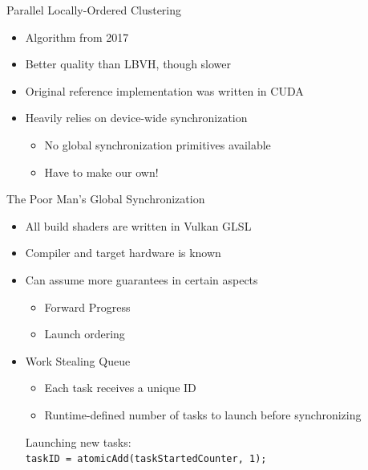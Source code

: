 \documentclass[aspectratio=169,t]{beamer}
\begin{document}
\begin{slide}{Parallel Locally-Ordered Clustering}
  \begin{itemize}
   \item Algorithm from 2017
   \item Better quality than LBVH, though slower
   \item Original reference implementation was written in CUDA
   \item Heavily relies on device-wide synchronization
   \begin{itemize}
    \item No global synchronization primitives available
    \item Have to make our own!
   \end{itemize}
  \end{itemize}
\end{slide}

\begin{slide}{The Poor Man's Global Synchronization}
  \begin{itemize}
   \item All build shaders are written in Vulkan GLSL
   \item Compiler and target hardware is known
   \item Can assume more guarantees in certain aspects
   \begin{itemize}
    \item Forward Progress
    \item Launch ordering
   \end{itemize}
   \item Work Stealing Queue
   \begin{itemize}
    \item Each task receives a unique ID
    \item Runtime-defined number of tasks to launch before synchronizing
   \end{itemize}
   Launching new tasks:\\
   \pause
   \texttt{taskID = atomicAdd(taskStartedCounter, 1);}\\
  \end{itemize}
\end{slide}
\end{document}
